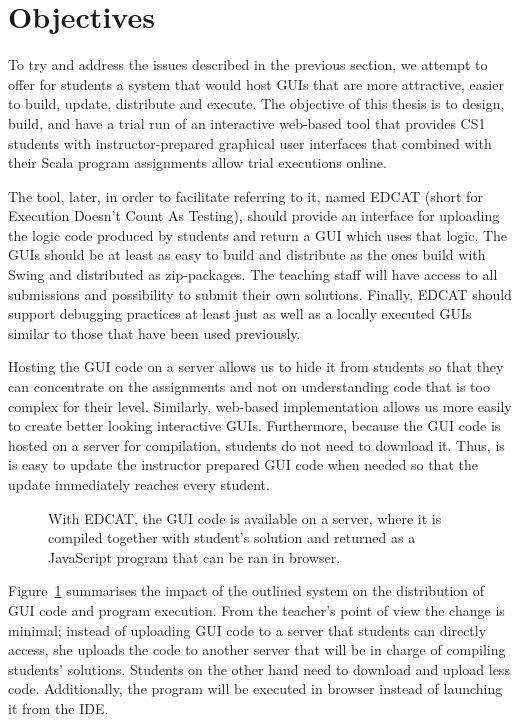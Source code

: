 \section{Objectives}
\label{section:objectives}

To try and address the issues described in the previous section, we attempt to offer for students a system that would host GUIs that are more attractive, easier to build, update, distribute and execute. The objective of this thesis is to design, build, and have a trial run of an interactive web-based tool that provides CS1 students with instructor-prepared graphical user interfaces that combined with their Scala program assignments allow trial executions online.

The tool, later, in order to facilitate referring to it, named EDCAT (short for Execution Doesn't Count As Testing), should provide an interface for uploading the logic code produced by students and return a GUI which uses that logic. The GUIs should be at least as easy to build and distribute as the ones build with Swing and distributed as zip-packages. The teaching staff will have access to all submissions and possibility to submit their own solutions. Finally, EDCAT should support debugging practices at least just as well as a locally executed GUIs similar to those that have been used previously.

Hosting the GUI code on a server allows us to hide it from students so that they can concentrate on the assignments and not on understanding code that is too complex for their level. Similarly, web-based implementation allows us more easily to create better looking interactive GUIs. Furthermore, because the GUI code is hosted on a server for compilation, students do not need to download it. Thus, is is easy to update the instructor prepared GUI code when needed so that the update immediately reaches every student.

\begin{figure}[b!]
	\begin{center}
		
	\end{center}
	\caption[asdf]{With EDCAT, the GUI code is available on a server, where it is compiled together with student's solution and returned as a JavaScript program that can be ran in browser.}
	\label{figure:what-changes}
\end{figure}

Figure~\ref{figure:what-changes} summarises the impact of the outlined system on the distribution of GUI code and program execution. From the teacher's point of view the change is minimal; instead of uploading GUI code to a server that students can directly access, she uploads the code to another server that will be in charge of compiling students' solutions. Students on the other hand need to download and upload less code. Additionally, the program will be executed in browser instead of launching it from the IDE.

